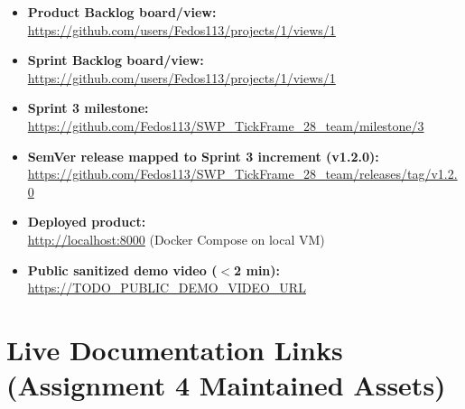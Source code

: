 \documentclass[11pt,a4paper]{article}
\begin{document}
\begin{itemize}[leftmargin=*]
    \item \textbf{Product Backlog board/view:} \\
          \url{https://github.com/users/Fedos113/projects/1/views/1}

    \item \textbf{Sprint Backlog board/view:} \\
          \url{https://github.com/users/Fedos113/projects/1/views/1}

    \item \textbf{Sprint 3 milestone:} \\
          \url{https://github.com/Fedos113/SWP_TickFrame_28_team/milestone/3}

    \item \textbf{SemVer release mapped to Sprint 3 increment (v1.2.0):} \\
          \url{https://github.com/Fedos113/SWP_TickFrame_28_team/releases/tag/v1.2.0}

    \item \textbf{Deployed product:} \\
          \url{http://localhost:8000} (Docker Compose on local VM)

    \item \textbf{Public sanitized demo video ($<$2 min):} \\
          \url{https://TODO_PUBLIC_DEMO_VIDEO_URL} %
\end{itemize}

\section{Live Documentation Links (Assignment 4 Maintained Assets)}
\end{document}
